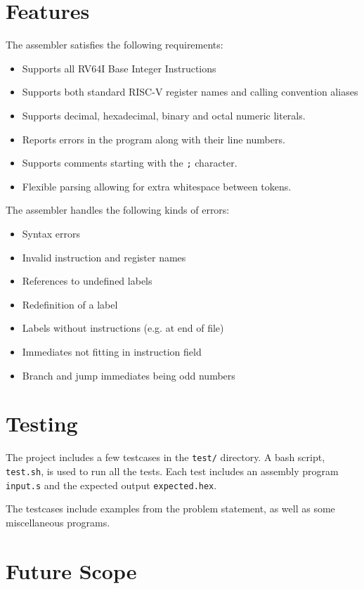 \documentclass{article}
\begin{document}
\section{Features}
The assembler satisfies the following requirements:

\begin{itemize}
    \item Supports all RV64I Base Integer Instructions
    \item Supports both standard RISC-V register names and calling convention aliases
    \item Supports decimal, hexadecimal, binary and octal numeric literals.
    \item Reports errors in the program along with their line numbers.
    \item Supports comments starting with the \texttt{;} character.
    \item Flexible parsing allowing for extra whitespace between tokens.
\end{itemize}
The assembler handles the following kinds of errors:

\begin{itemize}
    \item Syntax errors
    \item Invalid instruction and register names
    \item References to undefined labels
    \item Redefinition of a label
    \item Labels without instructions (e.g. at end of file)
    \item Immediates not fitting in instruction field
    \item Branch and jump immediates being odd numbers
\end{itemize}

\section{Testing}

The project includes a few testcases in the \texttt{test/} directory.
A bash script, \texttt{test.sh}, is used to run all the tests.
Each test includes an assembly program \texttt{input.s} and the
expected output \texttt{expected.hex}.

The testcases include examples from the problem statement, as well as
some miscellaneous programs.

\section{Future Scope}
\end{document}
